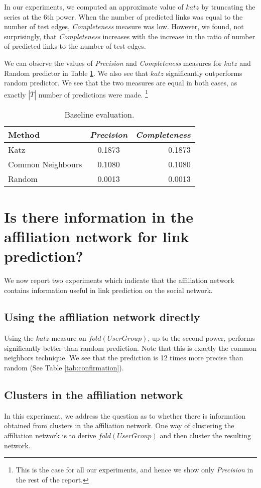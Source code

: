 \documentclass{report}
\begin{document}
In our experiments, we computed an approximate value of $katz$ by truncating the series at the 6th power. When the number of predicted links was equal to the number of test edges, \textit{Completeness} measure was low. However, we found, not surprisingly, that \textit{Completeness} increases with the increase in the ratio of number of predicted links to the number of test edges.

We can observe the values of \textit{Precision} and \textit{Completeness} measures for $katz$ and Random predictor in Table \ref{tab:baseline}. We also see that $katz$ significantly outperforms random predictor. We see that the two measures are equal in both cases, as exactly $|\bar{T}|$ number of predictions were made.
\footnote{This is the case for all our experiments, and hence we show only \textit{Precision} in the rest of the report.}

\begin{table}
\centering
\begin{tabular}{| l | c | r |}
\hline
Method& \textit{Precision} & \textit{Completeness}\\
\hline
 Katz & 0.1873 & 0.1873\\
 Common Neighbours \cite{kleinberg} & 0.1080 & 0.1080\\
 Random & 0.0013 & 0.0013\\
\hline
\end{tabular}
\caption{Baseline evaluation.}
\label{tab:baseline}
\end{table} 

\section{Is there information in the affiliation network for link prediction?}
We now report two experiments which indicate that the affiliation network contains information useful in link prediction on the social network.

\subsection{Using the affiliation network directly}
Using the $katz$ measure on $fold(UserGroup)$, up to the second power, performs significantly better than random prediction. Note that this is exactly the common neighbors technique. We see that the prediction is 12 times more precise than random (See Table \ref{tab:confirmation}).

\subsection{Clusters in the affiliation network}
In this experiment, we address the question as to whether there is information obtained from clusters in the affiliation network. One way of clustering the affiliation network is to derive $fold(UserGroup)$ and then cluster the resulting network.
\end{document}
